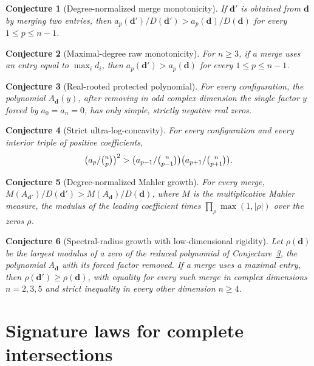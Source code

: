 \documentclass[11pt]{article}
\newtheorem{conjecture}{Conjecture}
\theoremstyle{definition}
\begin{document}
\begin{conjecture}[Degree-normalized merge monotonicity]\label{aa10}
If $\mathbf d'$ is obtained from $\mathbf d$ by merging two entries, then $a_p(\mathbf d')/D(\mathbf d')>a_p(\mathbf d)/D(\mathbf d)$ for every $1\le p\le n-1$.
\end{conjecture}

\begin{conjecture}[Maximal-degree raw monotonicity]\label{aa11}
For $n\ge3$, if a merge uses an entry equal to $\max_id_i$, then $a_p(\mathbf d')>a_p(\mathbf d)$ for every $1\le p\le n-1$.
\end{conjecture}

\begin{conjecture}[Real-rooted protected polynomial]\label{aa12}
For every configuration, the polynomial $A_{\mathbf d}(y)$, after removing in odd complex dimension the single factor $y$ forced by $a_0=a_n=0$, has only simple, strictly negative real zeros.
\end{conjecture}

\begin{conjecture}[Strict ultra-log-concavity]\label{aa13}
For every configuration and every interior triple of positive coefficients,
\[
\bigl(a_p/\tbinom np\bigr)^2>\bigl(a_{p-1}/\tbinom n{p-1}\bigr)\bigl(a_{p+1}/\tbinom n{p+1}\bigr).
\]
\end{conjecture}

\begin{conjecture}[Degree-normalized Mahler growth]\label{aa14}
For every merge, $M(A_{\mathbf d'})/D(\mathbf d')>M(A_{\mathbf d})/D(\mathbf d)$, where $M$ is the multiplicative Mahler measure, the modulus of the leading coefficient times $\prod_{\rho}\max(1,|\rho|)$ over the zeros $\rho$.
\end{conjecture}

\begin{conjecture}[Spectral-radius growth with low-dimensional rigidity]\label{aa15}
Let $\rho(\mathbf d)$ be the largest modulus of a zero of the reduced polynomial of Conjecture~\ref{aa12}, the polynomial $A_{\mathbf d}$ with its forced factor removed.  If a merge uses a maximal entry, then $\rho(\mathbf d')\ge\rho(\mathbf d)$, with equality for every such merge in complex dimensions $n=2,3,5$ and strict inequality in every other dimension $n\ge4$.
\end{conjecture}

\section{Signature laws for complete intersections}
\end{document}
